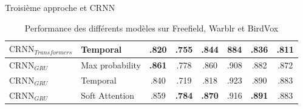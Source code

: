 \documentclass[compress,xcolor=table]{beamer}
\begin{document}
\begin{frame}{Troisième approche et CRNN}
\begin{table}[h]
{\begin{tabular}{llcccccc}
                \midrule
                $\textrm{CRNN}_{\textit{Transformers}}$ & Temporal                 & .820                              & .755                           & .844                        & 884           & .836          & .811          \\
                \midrule
                $\textrm{CRNN}_{GRU}$                   & Max probability          & \textbf{.861}                     & .778                           & .860                        & .908          & .882          & .872          \\
                $\textrm{CRNN}_{GRU}$                   & Temporal                 & .840                              & .719                           & .818                        & .923          & .890          & .883          \\
                $\textrm{CRNN}_{GRU}$                   & Soft Attention           & .859                              & \textbf{.784}                  & \textbf{.870}               & .916          & \textbf{.891} & .883          \\
                \bottomrule
            \end{tabular}
        }
        \caption{Performance des différents modèles sur Freefield, Warblr et BirdVox}
        \label{tab:performance.approche3}
    \end{table}

\end{frame}
\end{document}
